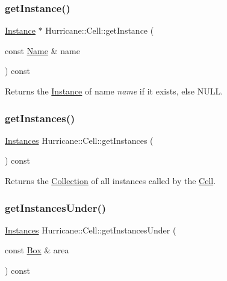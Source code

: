 \subsubsection{\texorpdfstring{get\+Instance()}{getInstance()}}
{\footnotesize\ttfamily \mbox{\hyperlink{classHurricane_1_1Instance}{Instance}} $\ast$ Hurricane\+::\+Cell\+::get\+Instance (\begin{DoxyParamCaption}\item[{const \mbox{\hyperlink{classHurricane_1_1Name}{Name}} \&}]{name }\end{DoxyParamCaption}) const\hspace{0.3cm}{\ttfamily [inline]}}

Returns the \mbox{\hyperlink{classHurricane_1_1Instance}{Instance}} of name {\itshape name} if it exists, else {\ttfamily N\+U\+LL}. \mbox{\label{classHurricane_1_1Cell_aa85b3992431b672827167c5d9cb622f2}} 
\subsubsection{\texorpdfstring{get\+Instances()}{getInstances()}}
{\footnotesize\ttfamily \mbox{\hyperlink{namespaceHurricane_ac9436b03a2926f34ad6863deae2baadc}{Instances}} Hurricane\+::\+Cell\+::get\+Instances (\begin{DoxyParamCaption}{ }\end{DoxyParamCaption}) const\hspace{0.3cm}{\ttfamily [inline]}}

Returns the \mbox{\hyperlink{classHurricane_1_1Collection}{Collection}} of all instances called by the \mbox{\hyperlink{classHurricane_1_1Cell}{Cell}}. \mbox{\label{classHurricane_1_1Cell_a5eb16d9d0f340ad71b81d794f6f8525f}} 
\subsubsection{\texorpdfstring{get\+Instances\+Under()}{getInstancesUnder()}}
{\footnotesize\ttfamily \mbox{\hyperlink{namespaceHurricane_ac9436b03a2926f34ad6863deae2baadc}{Instances}} Hurricane\+::\+Cell\+::get\+Instances\+Under (\begin{DoxyParamCaption}\item[{const \mbox{\hyperlink{classHurricane_1_1Box}{Box}} \&}]{area }\end{DoxyParamCaption}) const}

